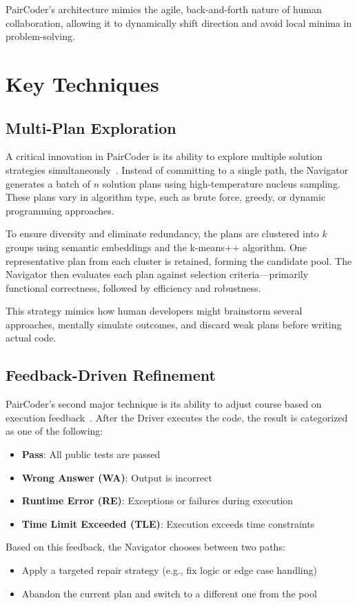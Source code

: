 \documentclass[11pt,a4paper]{article}
\begin{document}
PairCoder’s architecture mimics the agile, back-and-forth nature of human collaboration, allowing it to dynamically shift direction and avoid local minima in problem-solving.

\section{Key Techniques}
\subsection{Multi-Plan Exploration}
A critical innovation in PairCoder is its ability to explore multiple solution strategies simultaneously~\cite{zhang2024paircoder}. Instead of committing to a single path, the Navigator generates a batch of $n$ solution plans using high-temperature nucleus sampling. These plans vary in algorithm type, such as brute force, greedy, or dynamic programming approaches.

To ensure diversity and eliminate redundancy, the plans are clustered into $k$ groups using semantic embeddings and the k-means++ algorithm. One representative plan from each cluster is retained, forming the candidate pool. The Navigator then evaluates each plan against selection criteria—primarily functional correctness, followed by efficiency and robustness.

This strategy mimics how human developers might brainstorm several approaches, mentally simulate outcomes, and discard weak plans before writing actual code.

\subsection{Feedback-Driven Refinement}
PairCoder’s second major technique is its ability to adjust course based on execution feedback~\cite{zhang2024paircoder}. After the Driver executes the code, the result is categorized as one of the following:
\begin{itemize}
\item \textbf{Pass}: All public tests are passed
\item \textbf{Wrong Answer (WA)}: Output is incorrect
\item \textbf{Runtime Error (RE)}: Exceptions or failures during execution
\item \textbf{Time Limit Exceeded (TLE)}: Execution exceeds time constraints
\end{itemize}

Based on this feedback, the Navigator chooses between two paths:
\begin{itemize}
\item Apply a targeted repair strategy (e.g., fix logic or edge case handling)
\item Abandon the current plan and switch to a different one from the pool
\end{itemize}
\end{document}
